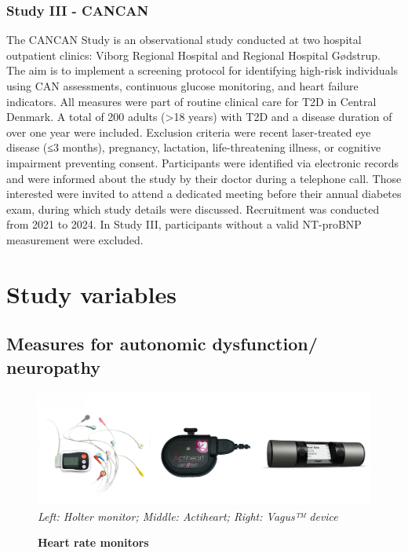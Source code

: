 \documentclass[
  a4paper,
  headsepline=true,
  open=left]{scrbook}
\begin{document}
\hypertarget{study-iii---cancan}{%
\subsubsection{Study III - CANCAN}\label{study-iii---cancan}}

The CANCAN Study is an observational study conducted at two hospital
outpatient clinics: Viborg Regional Hospital and Regional Hospital
Gødstrup. The aim is to implement a screening protocol for identifying
high-risk individuals using CAN assessments, continuous glucose
monitoring, and heart failure indicators. All measures were part of
routine clinical care for T2D in Central Denmark. A total of 200 adults
(\textgreater18 years) with T2D and a disease duration of over one year
were included. Exclusion criteria were recent laser-treated eye disease
(≤3 months), pregnancy, lactation, life-threatening illness, or
cognitive impairment preventing consent. Participants were identified
via electronic records and were informed about the study by their doctor
during a telephone call. Those interested were invited to attend a
dedicated meeting before their annual diabetes exam, during which study
details were discussed. Recruitment was conducted from 2021 to 2024. In
Study III, participants without a valid NT-proBNP measurement were
excluded.

\hypertarget{study-variables}{%
\section{Study variables}\label{study-variables}}

\hypertarget{measures-for-autonomic-dysfunction-neuropathy}{%
\subsection{Measures for autonomic dysfunction/
neuropathy}\label{measures-for-autonomic-dysfunction-neuropathy}}

\begin{figure}

{\centering 

\includegraphics{images/can_tools.pdf} \emph{Left: Holter monitor;
Middle: Actiheart; Right: Vagus™ device}

}

\caption{\label{fig-monitor}\textbf{Heart rate monitors}}

\end{figure}
\end{document}

